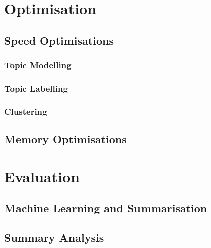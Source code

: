 \documentclass[12pt]{article}
\begin{document}


\newpage

\section{Optimisation}

\subsection{Speed Optimisations}

\subsubsection{Topic Modelling}

\label{topicmodellingoptimisation}

\subsubsection{Topic Labelling}

\subsubsection{Clustering}

\subsection{Memory Optimisations}


\newpage

\section{Evaluation}

\subsection{Machine Learning and Summarisation}


\subsection{Summary Analysis}
\end{document}
